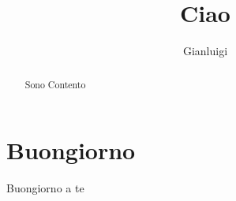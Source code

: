\documentclass[]{article}
\title{Ciao}
\author{Gianluigi}
\begin{document}
\maketitle

\begin{abstract}
Sono Contento
\end{abstract}

\section{Buongiorno}

Buongiorno a te
\end{document}
